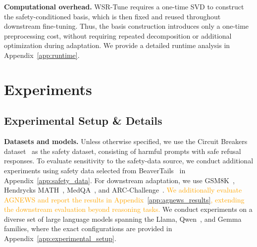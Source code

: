 \documentclass{article}
\newcommand{\djh}[1]{{\leavevmode\color{magenta}[DJ: #1]}}
\newcommand{\kms}[1]{{\leavevmode\color{blue}[MS: #1]}}
\newcommand{\wjb}[1]{{\leavevmode\color{orange}[jb: #1]}}
\begin{document}
\textbf{Computational overhead.} WSR-Tune requires a one-time SVD to construct the safety-conditioned basis, which is then fixed and reused throughout downstream fine-tuning. Thus, the basis construction introduces only a one-time preprocessing cost, without requiring repeated decomposition or additional optimization during adaptation. We provide a detailed runtime analysis in Appendix~\ref{app:runtime}.

\vspace{-2mm}
\section{Experiments}
\label{sec:experiments}
\vspace{-2mm}


\subsection{Experimental Setup \& Details}
\vspace{-1mm}



\textbf{Datasets and models.} Unless otherwise specified, we use the Circuit Breakers dataset~\citep{circuit_breakers} as the safety dataset, consisting of harmful prompts with safe refusal responses. To evaluate sensitivity to the safety-data source, we conduct additional experiments using safety data selected from BeaverTails~\citep{beavertails} in Appendix~\ref{app:safety_data}. For downstream adaptation, we use GSM8K~\citep{gsm8k}, Hendrycks MATH~\citep{hendrycksmath}, MedQA~\citep{medqa}, and ARC-Challenge~\citep{arc-c}. \textcolor{orange}{We additionally evaluate AGNEWS and report the results in Appendix~\ref{app:agnews_results}, extending the downstream evaluation beyond reasoning tasks.}  %
We conduct experiments on a diverse set of large language models spanning the Llama\citep{llama2, llama3}, Qwen~\citep{qwen2.5}, and Gemma~\citep{gemma2} families, where the exact configurations are provided in  Appendix~\ref{app:experimental_setup}. %
\end{document}
